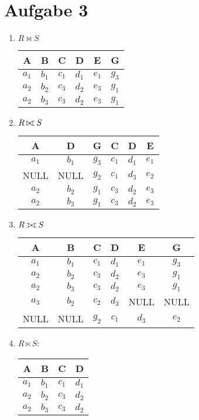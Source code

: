 \documentclass{article}
\def\ojoin{\setbox0=\hbox{$\bowtie$}%
	\rule[-.02ex]{.25em}{.4pt}\llap{\rule[\ht0]{.25em}{.4pt}}}
\def\rightouterjoin{\mathbin{\bowtie\mkern-5.8mu\ojoin}}
\def\fullouterjoin{\mathbin{\ojoin\mkern-5.8mu\bowtie\mkern-5.8mu\ojoin}}
\begin{document}
	\section*{Aufgabe 3}
	\begin{enumerate}[label=(\alph*)]
		\item $R\bowtie S$
		\begin{center}
			\begin{tabular}{c|c|c|c|c|c}
				\textbf{A} & \textbf{B} & \textbf{C} & \textbf{D} & \textbf{E} & \textbf{G} \\
				\hline
				$a_1$ & $b_1$ & $c_1$ & $d_1$ & $e_1$ & $g_3$ \\
				$a_2$ & $b_2$ & $c_3$ & $d_2$ & $e_3$ & $g_1$ \\
				$a_2$ & $b_3$ & $c_3$ & $d_2$ & $e_3$ & $g_1$
			\end{tabular}
		\end{center}
		\item $R\rightouterjoin S$
		\begin{center}
			\begin{tabular}{c|c|c|c|c|c}
				\textbf{A} & \textbf{D} & \textbf{G} & \textbf{C} & \textbf{D} & \textbf{E} \\
				\hline
				$a_1$ & $b_1$ & $g_3$ & $c_1$ & $d_1$ & $e_1$ \\
				NULL & NULL & $g_2$ & $c_1$ & $d_3$ & $e_2$ \\
				$a_2$ & $b_2$ & $g_1$ & $c_3$ & $d_2$ & $e_3$ \\
				$a_2$ & $b_3$ & $g_1$ & $c_3$ & $d_2$ & $e_3$
			\end{tabular}
		\end{center}
		\item $R\fullouterjoin S$
		\begin{center}
			\begin{tabular}{c|c|c|c|c|c}
				\textbf{A} & \textbf{B} & \textbf{C} & \textbf{D} & \textbf{E} & \textbf{G} \\
				\hline
				$a_1$ & $b_1$ & $c_1$ & $d_1$ & $e_1$ & $g_3$ \\
				$a_2$ & $b_2$ & $c_3$ & $d_2$ & $e_3$ & $g_1$ \\
				$a_2$ & $b_3$ & $c_3$ & $d_2$ & $e_3$ & $g_1$ \\
				$a_3$ & $b_2$ & $c_2$ & $d_3$ & NULL & NULL \\
				NULL & NULL & $g_2$ & $c_1$ & $d_3$ & $e_2$
			\end{tabular}
		\end{center}
		\item $R\ltimes S$:
		\begin{center}
			\begin{tabular}{c|c|c|c}
				\textbf{A} & \textbf{B} & \textbf{C} & \textbf{D} \\
				\hline
				$a_1$ & $b_1$ & $c_1$ & $d_1$ \\
				$a_2$ & $b_2$ & $c_3$ & $d_2$ \\
				$a_2$ & $b_3$ & $c_3$ & $d_2$
			\end{tabular}
		\end{center}
	\end{enumerate}
	
\end{document}
